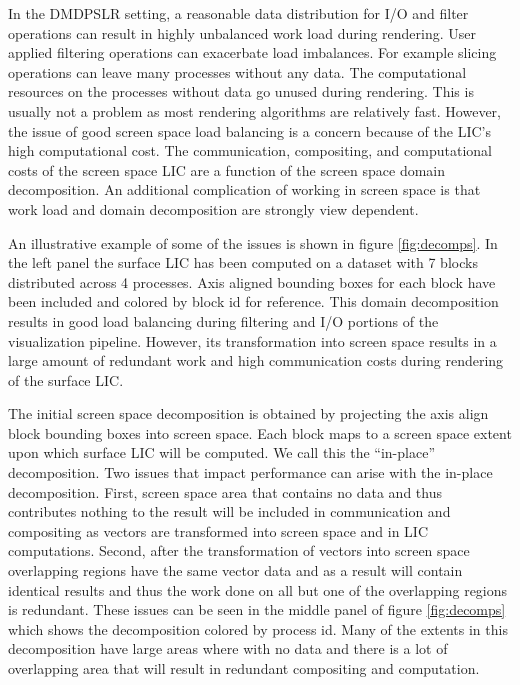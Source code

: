 \documentclass[a4paper,10pt]{article}
\begin{document}
In the DMDPSLR setting, a reasonable data distribution for I/O and filter operations can result in highly unbalanced work load during rendering. User applied filtering operations can exacerbate load imbalances. For example slicing operations can leave many processes without any data. The computational resources on the processes without data go unused during rendering. This is usually not a problem as most rendering algorithms are relatively fast. However, the issue of good screen space load balancing is a concern because of the LIC's high computational cost. The communication, compositing, and computational costs of the screen space LIC are a function of the screen space domain decomposition. An additional complication of working in screen space is that work load and domain decomposition are strongly view dependent. 

An illustrative example of some of the issues is shown in figure \ref{fig:decomps}. In the left panel the surface LIC has been computed on a dataset with 7 blocks distributed across 4 processes. Axis aligned bounding boxes for each block have been included and colored by block id for reference. This domain decomposition results in good load balancing during filtering and I/O portions of the visualization pipeline. However, its transformation into screen space results in a large amount of redundant work and high communication costs during rendering of the surface LIC. 

The initial screen space decomposition is obtained by projecting the axis align block bounding boxes into screen space. Each block maps to a screen space extent upon which surface LIC will be computed. We call this the ``in-place'' decomposition. Two issues that impact performance can arise with the in-place decomposition. First, screen space area that contains no data and thus contributes nothing to the result will be included in communication and compositing as vectors are transformed into screen space and in LIC computations. Second, after the transformation of vectors into screen space overlapping regions have the same vector data and as a result will contain identical results and thus the work done on all but one of the overlapping regions is redundant. These issues can be seen in the middle panel of figure \ref{fig:decomps} which shows the decomposition colored by process id. Many of the extents in this decomposition have large areas where with no data and there is a lot of overlapping area that will result in redundant compositing and computation.
\end{document}
